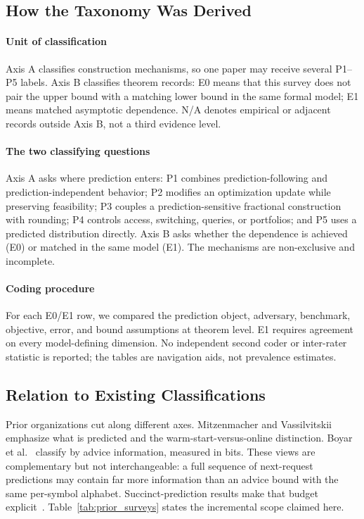 \documentclass[acmsmall,screen,nonacm]{acmart}
\theoremstyle{acmdefinition}%
\begin{document}
\subsection{How the Taxonomy Was Derived}
\label{subsec:taxonomy_method}

\paragraph{Unit of classification} Axis A classifies construction mechanisms, so one paper may receive several P1--P5 labels. Axis B classifies theorem records: E0 means that this survey does not pair the upper bound with a matching lower bound in the same formal model; E1 means matched asymptotic dependence. N/A denotes empirical or adjacent records outside Axis B, not a third evidence level.

\paragraph{The two classifying questions} Axis A asks where prediction enters: P1 combines prediction-following and prediction-independent behavior; P2 modifies an optimization update while preserving feasibility; P3 couples a prediction-sensitive fractional construction with rounding; P4 controls access, switching, queries, or portfolios; and P5 uses a predicted distribution directly. Axis B asks whether the dependence is achieved (E0) or matched in the same model (E1). The mechanisms are non-exclusive and incomplete.

\paragraph{Coding procedure} For each E0/E1 row, we compared the prediction object, adversary, benchmark, objective, error, and bound assumptions at theorem level. E1 requires agreement on every model-defining dimension. No independent second coder or inter-rater statistic is reported; the tables are navigation aids, not prevalence estimates.

\subsection{Relation to Existing Classifications}
\label{subsec:paradigm_relation}

Prior organizations cut along different axes. Mitzenmacher and Vassilvitskii~\cite{mitzenmacher2021algorithms,mitzenmacher2022survey} emphasize what is predicted and the warm-start-versus-online distinction. Boyar et al.~\cite{boyar2017advice} classify by advice information, measured in bits. These views are complementary but not interchangeable: a full sequence of next-request predictions may contain far more information than an advice bound with the same per-symbol alphabet. Succinct-prediction results make that budget explicit~\cite{antoniadis2023succinct}. Table~\ref{tab:prior_surveys} states the incremental scope claimed here.
\end{document}
